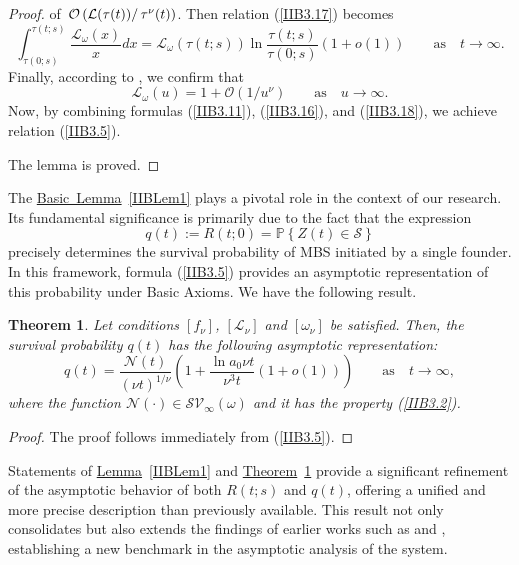 \documentclass[10pt,reqno]{amsart}
\newtheorem{theorem}{Theorem}
\theoremstyle{definition}
\numberwithin{equation}{section}
\begin{document}
\begin{proof}
    of $\left.\mathcal{O}\left({\mathcal{L}(\tau(t))}\right/{{\tau}^{\nu}(t)}\right)$.
    Then relation {(\ref{IIB3.17})} becomes
\begin{equation}                             \label{IIB3.18}
    \int_{\tau(0;s)}^{\tau(t;s)}{\frac{{{\mathcal{L}}_{\omega}}(x)}{x}dx}=
    {{\mathcal{L}}_{\omega}}(\tau(t;s))\ln\frac{\tau(t;s)}{\tau(0;s)}\left(1+o(1)\right)
    \qquad {\text{as}} \quad {t\to\infty}.
\end{equation}
    Finally, according to {\cite[Th3]{ImMDPI24}}, we confirm that
\[
    {{\mathcal{L}}_{\omega}}(u)=1+\mathcal{O}\left({1}/{{{u}^{\nu }}}\right)
    \qquad {\text{as}} \quad {u\to\infty}.
\]
    Now, by combining formulas {(\ref{IIB3.11})}, {(\ref{IIB3.16})},
    and {(\ref{IIB3.18})}, we achieve relation {(\ref{IIB3.5})}.

    The lemma is proved.
\end{proof}

    The {\hyperref[IIBLem1]{Basic~Lemma}~\ref{IIBLem1}} plays a pivotal role in the context of
    our research. Its fundamental significance is primarily due to the fact that the expression
\[
    q(t):=R(t;0)=\mathbb{P}\left\{Z(t)\in\mathcal{S}\right\}
\]
    precisely determines the survival probability of MBS initiated by a single founder. In this framework,
    formula {(\ref{IIB3.5})} provides an asymptotic representation of this probability under Basic Axioms.
    We have the following result.
\begin{theorem}                      \label{IIBTh1}
    Let conditions $[{{f}_{\nu }}]$, $[{{\mathcal{L}}_{\nu }}]$ and $[{{\omega }_{\nu }}]$ be satisfied.
    Then, the survival probability $q(t)$ has the following asymptotic representation:
\begin{equation}                             \label{IIB3.19}
    q(t)=\frac{\mathcal{N}(t)}{{(\nu{t})}^{1/{\nu}}}\left(1+\frac{\ln{{a}_{0}}\nu{t}}{{{\nu}^{3}}t}
    \left(1+o(1)\right)\right) \qquad {\text{as}} \quad {t\to\infty},
\end{equation}
    where the function $\mathcal{N}(\cdot)\in{{\mathcal{SV}}_{\infty}}(\omega)$ and it has the property {(\ref{IIB3.2})}.
\end{theorem}

\begin{proof}
    The proof follows immediately from {(\ref{IIB3.5})}.
\end{proof}

    Statements of {\hyperref[IIBLem1]{Lemma}~\ref{IIBLem1}} and {\hyperref[IIBTh1]{Theorem}~\ref{IIBTh1}} provide
    a significant refinement of the asymptotic behavior of  both ${R(t; s)}$ and ${q(t)}$, offering a unified and
    more precise description than previously available. This result not only consolidates but also extends the
    findings of earlier works such as {\cite{Pakes2010}} and {\cite{Zol57}}, establishing a new benchmark
    in the asymptotic analysis of the system.
\end{document}
